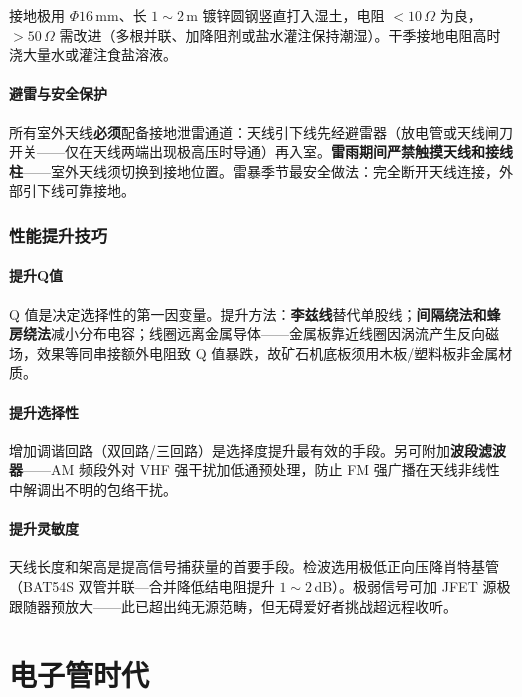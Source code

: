 \documentclass[12pt,UTF8]{ctexbook}
\begin{document}
接地极用 $\Phi16\,\mathrm{mm}$、长 $1\sim2\,\mathrm{m}$ 镀锌圆钢竖直打入湿土，电阻 $<10\,\Omega$ 为良，$>50\,\Omega$ 需改进（多根并联、加降阻剂或盐水灌注保持潮湿）。干季接地电阻高时浇大量水或灌注食盐溶液。

\subsection{避雷与安全保护}

所有室外天线\textbf{必须}配备接地泄雷通道：天线引下线先经避雷器（放电管或天线闸刀开关——仅在天线两端出现极高压时导通）再入室。\textbf{雷雨期间严禁触摸天线和接线柱}——室外天线须切换到接地位置。雷暴季节最安全做法：完全断开天线连接，外部引下线可靠接地。

\section{性能提升技巧}
\label{sec:crystal_performance}

\subsection{提升Q值}

Q 值是决定选择性的第一因变量。提升方法：\textbf{李兹线}替代单股线；\textbf{间隔绕法和蜂房绕法}减小分布电容；线圈远离金属导体——金属板靠近线圈因涡流产生反向磁场，效果等同串接额外电阻致 Q 值暴跌，故矿石机底板须用木板/塑料板非金属材质。

\subsection{提升选择性}

增加调谐回路（双回路/三回路）是选择度提升最有效的手段。另可附加\textbf{波段滤波器}——AM 频段外对 VHF 强干扰加低通预处理，防止 FM 强广播在天线非线性中解调出不明的包络干扰。

\subsection{提升灵敏度}

天线长度和架高是提高信号捕获量的首要手段。检波选用极低正向压降肖特基管（BAT54S 双管并联—合并降低结电阻提升 $1\sim2\,\mathrm{dB}$）。极弱信号可加 JFET 源极跟随器预放大——此已超出纯无源范畴，但无碍爱好者挑战超远程收听。


\part{电子管时代}
\end{document}
